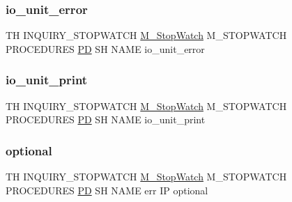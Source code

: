 \subsubsection{\texorpdfstring{io\+\_\+unit\+\_\+error}{io\_unit\_error}}
{\footnotesize\ttfamily TH I\+N\+Q\+U\+I\+R\+Y\+\_\+\+S\+T\+O\+P\+W\+A\+T\+CH \hyperlink{option__stopwatch_83_8txt_aa2011fc45a5e502e87ee50996a8a9305}{M\+\_\+\+Stop\+Watch} M\+\_\+\+S\+T\+O\+P\+W\+A\+T\+CH P\+R\+O\+C\+E\+D\+U\+R\+ES \hyperlink{what__overview_81_8txt_a85f26da5a4481fbdb0d9c79f2b94de3e}{PD} SH N\+A\+ME io\+\_\+unit\+\_\+error}

\mbox{\label{inquiry__stopwatch_83_8txt_ad67f5f613d63ccb3ff87efe190d2c9c1}} 
\subsubsection{\texorpdfstring{io\+\_\+unit\+\_\+print}{io\_unit\_print}}
{\footnotesize\ttfamily TH I\+N\+Q\+U\+I\+R\+Y\+\_\+\+S\+T\+O\+P\+W\+A\+T\+CH \hyperlink{option__stopwatch_83_8txt_aa2011fc45a5e502e87ee50996a8a9305}{M\+\_\+\+Stop\+Watch} M\+\_\+\+S\+T\+O\+P\+W\+A\+T\+CH P\+R\+O\+C\+E\+D\+U\+R\+ES \hyperlink{what__overview_81_8txt_a85f26da5a4481fbdb0d9c79f2b94de3e}{PD} SH N\+A\+ME io\+\_\+unit\+\_\+print}

\mbox{\label{inquiry__stopwatch_83_8txt_ae6234c62ee65662c46e3ce6056a3f252}} 
\subsubsection{\texorpdfstring{optional}{optional}}
{\footnotesize\ttfamily TH I\+N\+Q\+U\+I\+R\+Y\+\_\+\+S\+T\+O\+P\+W\+A\+T\+CH \hyperlink{option__stopwatch_83_8txt_aa2011fc45a5e502e87ee50996a8a9305}{M\+\_\+\+Stop\+Watch} M\+\_\+\+S\+T\+O\+P\+W\+A\+T\+CH P\+R\+O\+C\+E\+D\+U\+R\+ES \hyperlink{what__overview_81_8txt_a85f26da5a4481fbdb0d9c79f2b94de3e}{PD} SH N\+A\+ME err IP optional}

\mbox{\label{inquiry__stopwatch_83_8txt_a70e15afb456eff58f321ed840953c7f5}} 
